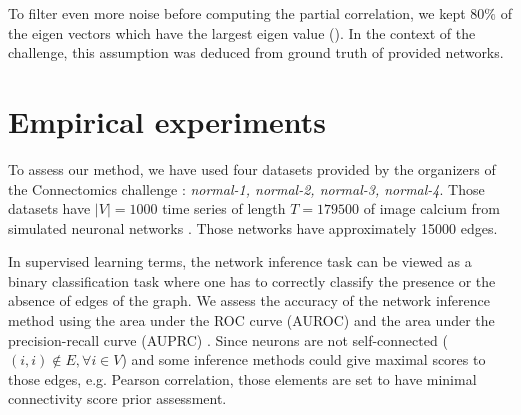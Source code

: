 \documentclass[wcp]{jmlr}
\begin{document}
To filter even more noise before computing the partial correlation, we kept
$80\%$ of the eigen vectors which have the largest eigen
value (\cite{tipping1999mixtures}). In the context of the challenge, this
assumption was deduced from ground truth of provided networks.


\section{Empirical experiments} \label{sec:results}






To assess our method, we have used four datasets provided by the organizers
of the Connectomics challenge : \textit{normal-1, normal-2, normal-3, normal-4}.
Those datasets have $|V|=1000$ time series of length $T=179500$ of image
calcium from simulated neuronal networks \citep{stetter2012model}. Those
networks have approximately 15000 edges.

In supervised learning terms, the network inference task can be viewed as a
binary classification task where one has to correctly classify the presence
or the absence of edges of the graph. We assess the accuracy of the
network inference method using the area under the ROC curve (AUROC)
and the area under the precision-recall curve (AUPRC)
\citep{schrynemackers2013protocols}. Since neurons are not self-connected
($(i, i) \not \in E, \forall i \in V$) and some inference methods could
give maximal scores to those edges, e.g. Pearson
correlation, those elements are set to have minimal connectivity score prior
assessment.
\end{document}
